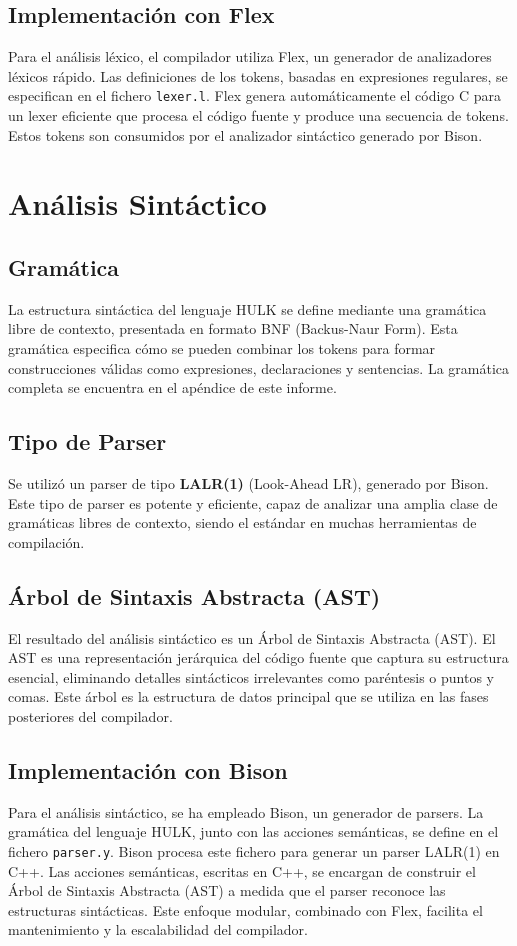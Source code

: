 \documentclass{article}
\begin{document}
    \subsection{Implementación con Flex}
    Para el análisis léxico, el compilador utiliza Flex, un generador de analizadores léxicos rápido. Las definiciones de los tokens, basadas en expresiones regulares, se especifican en el fichero \texttt{lexer.l}. Flex genera automáticamente el código C para un lexer eficiente que procesa el código fuente y produce una secuencia de tokens. Estos tokens son consumidos por el analizador sintáctico generado por Bison.

\section{Análisis Sintáctico}
    \subsection{Gramática}
    La estructura sintáctica del lenguaje HULK se define mediante una gramática libre de contexto, presentada en formato BNF (Backus-Naur Form). Esta gramática especifica cómo se pueden combinar los tokens para formar construcciones válidas como expresiones, declaraciones y sentencias. La gramática completa se encuentra en el apéndice de este informe.
    \subsection{Tipo de Parser}
    Se utilizó un parser de tipo \textbf{LALR(1)} (Look-Ahead LR), generado por Bison. Este tipo de parser es potente y eficiente, capaz de analizar una amplia clase de gramáticas libres de contexto, siendo el estándar en muchas herramientas de compilación.
    \subsection{Árbol de Sintaxis Abstracta (AST)}
    El resultado del análisis sintáctico es un Árbol de Sintaxis Abstracta (AST). El AST es una representación jerárquica del código fuente que captura su estructura esencial, eliminando detalles sintácticos irrelevantes como paréntesis o puntos y comas. Este árbol es la estructura de datos principal que se utiliza en las fases posteriores del compilador.
    \subsection{Implementación con Bison}
    Para el análisis sintáctico, se ha empleado Bison, un generador de parsers. La gramática del lenguaje HULK, junto con las acciones semánticas, se define en el fichero \texttt{parser.y}. Bison procesa este fichero para generar un parser LALR(1) en C++. Las acciones semánticas, escritas en C++, se encargan de construir el Árbol de Sintaxis Abstracta (AST) a medida que el parser reconoce las estructuras sintácticas. Este enfoque modular, combinado con Flex, facilita el mantenimiento y la escalabilidad del compilador.
\end{document}
